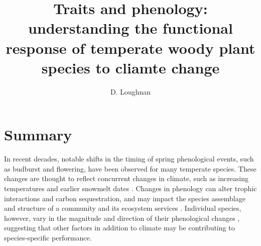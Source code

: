 \documentclass{article}\usepackage[]{graphicx}\usepackage[]{color}
\begin{document}

\title{Traits and phenology: understanding the functional response of temperate woody plant species to cliamte change} %

\author{D. Loughnan}
\maketitle  %


\section*{Summary}

\par In recent decades, notable shifts in the timing of spring phenological events, such as budburst and flowering, have been observed for many temperate species. These changes are thought to reflect concurrent changes in climate, such as increasing temperatures and earlier snowmelt dates \cite{ Anderson2012}. Changes in phenology can alter trophic interactions and carbon sequestration, and may impact the species assemblage and structure of a community and its ecosystem services \cite{Kharouba2018, Cleland:2007}. Individual species, however, vary in the magnitude and direction of their phenological changes \cite{Fitter2002,Dunnell2011, Konig2018}, suggesting that other factors in addition to climate may be contributing to species-specific performance.
\end{document}
